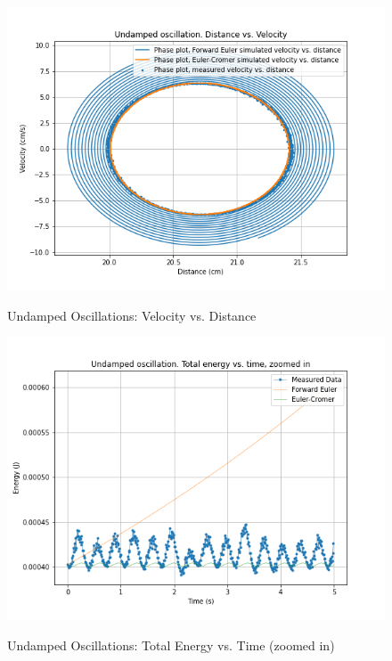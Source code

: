 \documentclass[letterpaper,12pt]{article}
\begin{document}
\begin{figure}[H]
  \centering
  \includegraphics[width=0.95\linewidth]{../Fredrik/Undamped oscillation. Distance vs. Velocity.png}    
  \begin{center}
    \emph{}
  \end{center}
  \caption{Undamped Oscillations: Velocity vs. Distance}
  \label{undamped-v-d-plot}
\end{figure}

\begin{figure}[H]
  \centering
  \includegraphics[width=0.95\linewidth]{../Fredrik/Undamped oscillation. Total energy vs. time, zoomed in.png}    
  \begin{center}
    \emph{}
  \end{center}
  \caption{Undamped Oscillations: Total Energy vs. Time (zoomed in)}
  \label{undamped-e-t-z-plot}
\end{figure}
\end{document}
